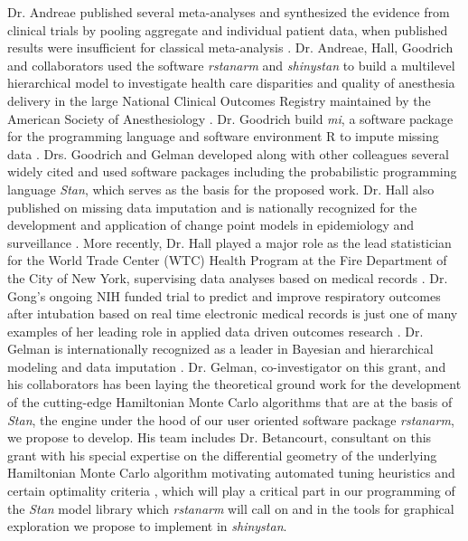 \documentclass[11pt,notitlepage]{article}
\begin{document}
Dr. Andreae published several meta-analyses and synthesized the evidence 
from clinical trials by pooling aggregate and individual patient data, when 
published results were insufficient for classical meta-analysis 
\cite{AndreaeJohnsonAbstract2013, Andreae2013, Andreae2015, Carter2015, Atchabahian2015}. Dr. Andreae, Hall, Goodrich and 
collaborators used the software \textit{rstanarm} and \textit{shinystan} to build a multilevel 
hierarchical model to investigate health care disparities and quality of 
anesthesia delivery in the large National Clinical Outcomes Registry maintained 
by the American Society of Anesthesiology \cite{AndreaeWhite2015}. Dr. Goodrich 
build \textit{mi}, a software package for the programming language and 
software environment R to impute missing data \cite{miCRAN}. Drs. Goodrich 
and Gelman developed along with other colleagues several widely cited and used software packages 
including the probabilistic programming language \textit{Stan}\cite{Stan_Software_2014}, 
which serves as the basis for the proposed work. Dr. Hall also published on missing data 
imputation \cite{Hall2009a, Wang_20029935, Wang_20029935} and is nationally 
recognized for the development and application of change point models in 
epidemiology and surveillance 
\cite{Hall2000, Hall2001, Hall2003bayesian, Hall2009, Hall2015}. 
More recently, Dr. Hall played a major role as the lead statistician 
for the World Trade Center (WTC) Health Program at the Fire Department 
of the City of New York, supervising data analyses based on medical 
records \cite{Aldrich2010, Hall2015, Zeig-Owens2011}.  
Dr. Gong's ongoing NIH funded trial to predict and improve 
respiratory outcomes after intubation based on real time 
electronic medical records is just one of many examples of her 
leading role in applied data driven outcomes research 
\cite{Gong2005, Gong2010, Gajic2011, Yu_24970344, Kor2014}. 
Dr. Gelman is internationally recognized as a leader in Bayesian and hierarchical 
modeling and data imputation 
\cite{Gelman1998notasked, Gelman2001imputation, Hoffman2014, Gelman-Hill_2014}. 
Dr. Gelman, co-investigator on this grant, and his collaborators has been laying the 
theoretical ground work for the development of the cutting-edge Hamiltonian 
Monte Carlo algorithms \cite{Hoffman2014,Stan_Software_2014} 
that are at the basis of \textit{Stan}, the engine 
under the hood of our user oriented software package \textit{rstanarm}, 
we propose to develop. His team includes Dr. Betancourt, 
consultant on this grant with his special expertise on the differential 
geometry of the underlying Hamiltonian Monte Carlo algorithm
motivating automated tuning heuristics and certain optimality criteria 
\cite{BetancourtGeometry2016}, which will play a 
critical part in our programming of the \textit{Stan} model library 
which \textit{rstanarm} will call on and in the tools for graphical exploration
we propose to implement in \textit{shinystan}.
\end{document}
